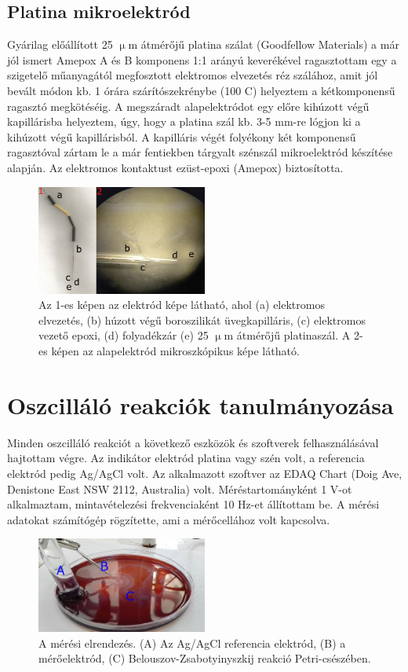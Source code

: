 \subsection{Platina mikroelektród}
Gyárilag előállított 25 $\upmu$m átmérőjű platina szálat (Goodfellow Materials) a már jól ismert Amepox A és B komponens 1:1 arányú keverékével ragasztottam egy a szigetelő műanyagától megfosztott elektromos elvezetés réz szálához, amit jól bevált módon kb. 1 órára szárítószekrénybe (100 \textdegree C) helyeztem a kétkomponensű ragasztó megkötéséig. A megszáradt alapelektródot egy előre kihúzott végű kapillárisba helyeztem, úgy, hogy a platina szál kb. 3-5 mm-re lógjon ki a kihúzott végű kapillárisból. A kapilláris végét folyékony két komponensű ragasztóval zártam le a már fentiekben tárgyalt szénszál mikroelektród készítése alapján. Az elektromos kontaktust ezüst-epoxi (Amepox) biztosította.
\begin{figure}[h]
\centering
\includegraphics[width=0.5\textwidth]{img/platina.png}
\caption{Az 1-es képen az elektród képe látható, ahol (a) elektromos elvezetés, (b) húzott végű boroszilikát üvegkapilláris, (c) elektromos vezető epoxi, (d) folyadékzár  (e) 25 $\upmu$m átmérőjű platinaszál. A 2-es képen az alapelektród mikroszkópikus képe látható.}
\label{fig:ionophores}
\end{figure}


\section{Oszcilláló reakciók tanulmányozása} 

Minden oszcilláló reakciót a következő eszközök és szoftverek felhasználásával hajtottam végre. Az indikátor elektród platina vagy szén volt, a referencia elektród pedig Ag/AgCl volt. Az alkalmazott szoftver az EDAQ Chart (Doig Ave, Denistone East NSW 2112, Australia) volt. Méréstartományként 1 V-ot alkalmaztam, mintavételezési frekvenciaként 10 Hz-et állítottam be. A mérési adatokat számítógép rögzítette, ami a mérőcellához volt kapcsolva.

\begin{figure}[h!]
\centering
\includegraphics[width=0.5\textwidth]{img/setup.png}
\caption{A mérési elrendezés. (A) Az Ag/AgCl referencia elektród, (B) a mérőelektród, (C) Belouszov-Zsabotyinyszkij reakció Petri-csészében.}
\label{fig:setup}
\end{figure}


